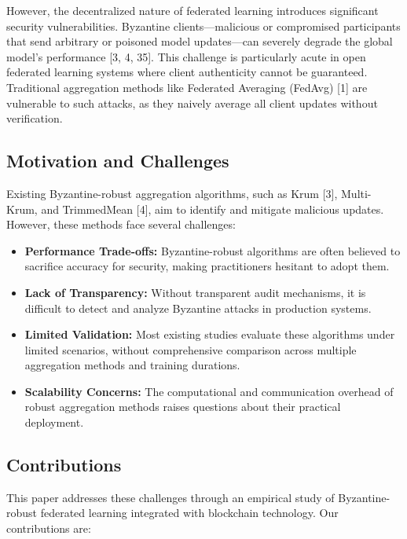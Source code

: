 \documentclass[12pt,a4paper,onecolumn]{article}
\begin{document}
However, the decentralized nature of federated learning introduces significant security vulnerabilities. Byzantine clients---malicious or compromised participants that send arbitrary or poisoned model updates---can severely degrade the global model's performance [3, 4, 35]. This challenge is particularly acute in open federated learning systems where client authenticity cannot be guaranteed. Traditional aggregation methods like Federated Averaging (FedAvg) [1] are vulnerable to such attacks, as they naively average all client updates without verification.

\subsection{Motivation and Challenges}

Existing Byzantine-robust aggregation algorithms, such as Krum [3], Multi-Krum, and TrimmedMean [4], aim to identify and mitigate malicious updates. However, these methods face several challenges:

\begin{itemize}
    \item \textbf{Performance Trade-offs:} Byzantine-robust algorithms are often believed to sacrifice accuracy for security, making practitioners hesitant to adopt them.
    \item \textbf{Lack of Transparency:} Without transparent audit mechanisms, it is difficult to detect and analyze Byzantine attacks in production systems.
    \item \textbf{Limited Validation:} Most existing studies evaluate these algorithms under limited scenarios, without comprehensive comparison across multiple aggregation methods and training durations.
    \item \textbf{Scalability Concerns:} The computational and communication overhead of robust aggregation methods raises questions about their practical deployment.
\end{itemize}

\subsection{Contributions}

This paper addresses these challenges through an empirical study of Byzantine-robust federated learning integrated with blockchain technology. Our contributions are:
\end{document}
